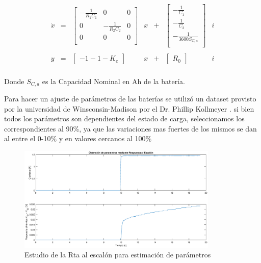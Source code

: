 \documentclass[10pt,a4paper]{article}
\begin{document}
\begin{equation}
    \begin{array}{llcllcl}
	\dot{x} & = & \begin{bmatrix}
	    -\frac{1}{R_1 C_1} &            0       & 0 \\
	    0                  & -\frac{1}{R_2 C_2} & 0 \\
	    0                  &            0       & 0 \\
	\end{bmatrix} & x & + &     \begin{bmatrix}
	    -\frac{1}{C_1} \\
	    -\frac{1}{C_2}  \\
	    -\frac{1}{3600 S_{C,a}}\\
	\end{bmatrix} & i \\
	\\
	y & = & \begin{bmatrix}
	    -1-1-K_e 
	\end{bmatrix} & x & + & \begin{bmatrix}
	    R_0
	\end{bmatrix} & i \\
    \end{array}
	\label{SS_model_eq}
\end{equation}

Donde $S_{C,a}$ es la Capacidad Nominal en Ah de la batería. 

Para hacer un ajuste de parámetros de las baterías se utilizó un dataset
provisto por la universidad de Winsconsin-Madison por el Dr. Phillip Kollmeyer
\cite{Kollmeyer2018}. si bien todos los parámetros son dependientes del estado
de carga, seleccionamos los correspondientes al 90\%, ya que las variaciones mas
fuertes de los mismos se dan al entre el 0-10\% y en valores cercanos al 100\%

\begin{figure}[h!]
    \begin{center}
	\includegraphics[width=0.85\textwidth]{rta_escalon.eps}
	\caption{Estudio de la Rta al escalón para estimación de parámetros}
	\label{rta_escalon}
    \end{center}
\end{figure}
\FloatBarrier
\end{document}
